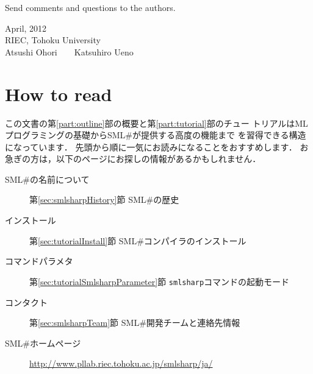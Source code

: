 \documentclass{jbook}
\newcommand{\txt}[2]{#2}
\newcommand{\smlsharp}{SML\#}
\newcommand{\authors}
{\txt{大堀\ \ 淳\mbox{\ \ \ \ }上野 雄大}
{Atsushi Ohori\mbox{\ \ \ \ }Katsuhiro Ueno}
}
\begin{document}
	Send comments and questions to the authors.
\fi%

\begin{flushright}
\txt{
2012年4月\\
東北大学電気通信研究所\\
\authors
}
{
April, 2012\\
RIEC, Tohoku University\\
\authors
}
\end{flushright}

\chapter*{\txt{本書の使い方}{How to read}}

\ifx\jp%
    この文書の第\ref{part:outline}部の概要と第\ref{part:tutorial}部のチュー
トリアルはMLプログラミングの基礎から\smlsharp{}が提供する高度の機能まで
を習得できる構造になっています．
	先頭から順に一気にお読みになることをおすすめします．
	お急ぎの方は，以下のページにお探しの情報があるかもしれません．
\begin{description}
\item[\smlsharp{}の名前について]
第\ref{sec:smlsharpHistory}節 \smlsharp{}の歴史
\item[インストール]
第\ref{sec:tutorialInstall}節 \smlsharp{}コンパイラのインストール
\item[コマンドパラメタ]
第\ref{sec:tutorialSmlsharpParameter}節 {\tt smlsharp}コマンドの起動モード
\item[コンタクト]
第\ref{sec:smlsharpTeam}節 \smlsharp{}開発チームと連絡先情報
\item[\smlsharp{}ホームページ] 
\url{http://www.pllab.riec.tohoku.ac.jp/smlsharp/ja/}
\end{description}    
\end{document}
